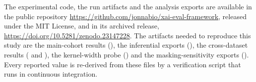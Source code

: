 \documentclass{cleiej}
\newcommand{\zenodoversiondoi}{\url{https://doi.org/10.5281/zenodo.23147228}}
\newif\ifblind
\begin{document}
The experimental code, the run artifacts and the analysis exports are
available in \ifblind a public repository and in a versioned archive with a
DOI, both released under the MIT License; their addresses are withheld for
double-blind review\else the public repository
\url{https://github.com/jonnabio/xai-eval-framework}, released under the
MIT License, and in its archived release, \zenodoversiondoi{}\fi. The
artifacts needed to reproduce this study are the main-cohort results
(), the inferential exports
(), the cross-dataset results
( and
), the kernel-width probe
() and the
masking-sensitivity exports
(). Every reported value
is re-derived from these files by a verification script that runs in
continuous integration.
\end{document}
